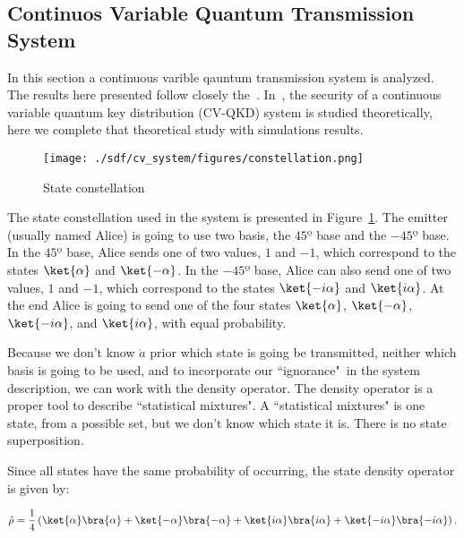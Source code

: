 \documentclass[../../sdf/tex/cv_system]{subfiles}
\date{}
\begin{document}
\onlyinsubfile{\maketitle}

\subsection*{Continuos Variable Quantum Transmission System}\label{sec:intro}

In this section a continuous varible qauntum transmission system is analyzed.
The results here presented follow closely the~\cite{namiki2003security}.
In~\cite{namiki2003security}, the security of a continuous variable quantum key distribution (CV-QKD) system is studied theoretically, here we complete that theoretical study with simulations results.

\begin{figure}[h]
\centering
\texttt{[image: ./sdf/cv\_system/figures/constellation.png]}
\caption{State constellation}
\label{fig:const}
\end{figure}

The state constellation used in the system is presented in Figure~\ref{fig:const}.
The emitter (usually named Alice) is going to use two basis, the $45º$ base and the $-45º$ base.
In the $45º$ base, Alice sends one of two values, $1$ and $-1$, which correspond to the states $\ket{\alpha}$ and $\ket{-\alpha}$.
In the $-45º$ base, Alice can also send one of two values, $1$ and $-1$, which correspond to the states $\ket{-i\alpha}$ and $\ket{i\alpha}$.
At the end Alice is going to send one of the four states $\ket{\alpha}$, $\ket{-\alpha}$, $\ket{-i\alpha}$, and $\ket{i\alpha}$, with equal probability.

Because we don't know $\grave{a}$ prior which state is going be transmitted, neither which basis is going to be used, and to incorporate our ``ignorance"\, in the system description, we can work with the density operator. The density operator is a proper tool to describe ``statistical mixtures". A ``statistical mixtures" is one state, from a possible set, but we don't know which state it is. There is no state superposition.

Since all states have the same probability of occurring, the state density operator is given by:

\begin{equation}\label{eq:statedensity}
\hat{\rho}=\frac{1}{4}\left(\ket{\alpha}\bra{\alpha}+\ket{-\alpha}\bra{-\alpha}+\ket{i\alpha}\bra{i\alpha}+\ket{-i\alpha}\bra{-i\alpha}\right).
\end{equation}
\end{document}
